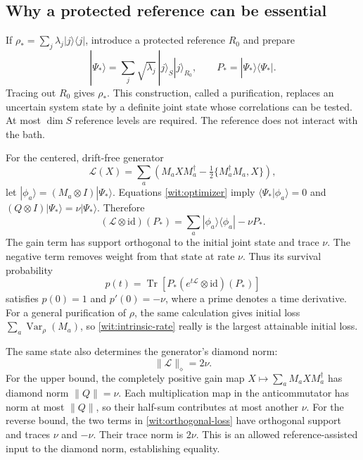 \documentclass[11pt,a4paper]{article}
\numberwithin{equation}{section}
\theoremstyle{remark}
\DeclareMathOperator{\Tr}{Tr}
\DeclareMathOperator{\Var}{Var}
\begin{document}
\subsection{Why a protected reference can be essential}

If $\rho_*=\sum_j\lambda_j|j\rangle\langle j|$, introduce a protected
reference $R_0$ and prepare
\begin{equation}
 |\Psi_*\rangle=\sum_j\sqrt{\lambda_j}\,
 |j\rangle_S|j\rangle_{R_0},\qquad
 P_*=|\Psi_*\rangle\langle\Psi_*|.
 \label{wit:purification}
\end{equation}
Tracing out $R_0$ gives $\rho_*$. This construction, called a
purification, replaces an uncertain system state by a definite joint
state whose correlations can be tested. At most $\dim S$ reference
levels are required. The reference does not interact with the bath.

For the centered, drift-free generator
\begin{equation}
 \mathcal L(X)=\sum_a\left(M_aXM_a^\dagger
                 -\tfrac12\{M_a^\dagger M_a,X\}\right),
 \label{wit:centered-generator}
\end{equation}
let $|\phi_a\rangle=(M_a\otimes I)|\Psi_*\rangle$. Equations
\eqref{wit:optimizer} imply $\langle\Psi_*|\phi_a\rangle=0$ and
$(Q\otimes I)|\Psi_*\rangle=\nu|\Psi_*\rangle$. Therefore
\begin{equation}
 (\mathcal L\otimes\mathrm{id})(P_*)
 =\sum_a|\phi_a\rangle\langle\phi_a|-\nu P_*.
 \label{wit:orthogonal-loss}
\end{equation}
The gain term has support orthogonal to the initial joint state and
trace $\nu$. The negative term removes weight from that state at rate
$\nu$. Thus its survival probability
\begin{equation}
 p(t)=\Tr\!\left[P_*(e^{t\mathcal L}\otimes\mathrm{id})(P_*)\right]
\end{equation}
satisfies $p(0)=1$ and $p'(0)=-\nu$, where a prime denotes a time
derivative. For a general purification of $\rho$, the same calculation
gives initial loss $\sum_a\Var_\rho(M_a)$, so \eqref{wit:intrinsic-rate}
really is the largest attainable initial loss.

The same state also determines the generator's diamond norm:
\begin{equation}
 \|\mathcal L\|_\diamond=2\nu.
 \label{wit:generator-norm}
\end{equation}
For the upper bound, the completely positive gain map
$X\mapsto\sum_aM_aXM_a^\dagger$ has diamond norm $\|Q\|=\nu$.
Each multiplication map in the anticommutator has norm at most
$\|Q\|$, so their half-sum contributes at most another $\nu$.
For the reverse bound, the two terms in \eqref{wit:orthogonal-loss}
have orthogonal support and traces $\nu$ and $-\nu$. Their trace norm
is $2\nu$. This is an allowed reference-assisted input to the diamond
norm, establishing equality.
\end{document}
